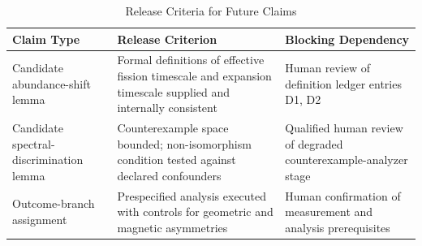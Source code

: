 \documentclass[conference]{IEEEtran}
\begin{document}
\begin{table}[htbp]
\centering
\footnotesize
\setlength{\tabcolsep}{3pt}
\renewcommand{\arraystretch}{1.12}
\caption{Release Criteria for Future Claims}
\label{tab:appendix-evidence-and-review-b3}
\begin{tabular}{|p{}|p{}|p{}|}
\hline
Claim Type & Release Criterion & Blocking Dependency \\\hline
Candidate abundance-shift lemma & Formal definitions of effective fission timescale and expansion timescale supplied and internally consistent & Human review of definition ledger entries D1, D2 \\\hline
Candidate spectral-discrimination lemma & Counterexample space bounded; non-isomorphism condition tested against declared confounders & Qualified human review of degraded counterexample-analyzer stage \\\hline
Outcome-branch assignment & Prespecified analysis executed with controls for geometric and magnetic asymmetries & Human confirmation of measurement and analysis prerequisites \\\hline
\end{tabular}
\end{table}

\end{document}
